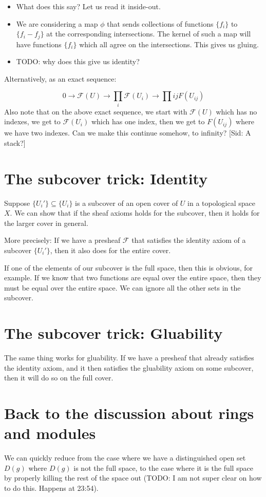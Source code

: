 \documentclass{book}
\newcommand{\F}{\ensuremath{\mathcal{F}}}
\theoremstyle{definition}
\begin{document}
\begin{itemize}
\item What does this say? Let us read it inside-out.
\item We are considering a map  $\phi$ that sends collections of functions $\{ f_i \}$ to $\{ f_i - f_j \}$ at the corresponding
      intersections. The kernel of such a map will have functions $\{ f_i \}$ which all agree on the intersections. This
      gives us gluing.
\item TODO: why does this give us identity?
\end{itemize}

Alternatively, as an exact sequence:

$$ 0 \rightarrow \F(U) \rightarrow \prod_i \F(U_i) \rightarrow \prod{ij} F(U_{ij}) $$
Also note that on the above exact sequence, we start with $\F(U)$ which has no
indexes, we get to $\F(U_i)$ which has one index, then we get to
$F(U_{ij})$ where we have two indexes. Can we make this continue somehow,
to infinity? [Sid: A stack?]

\section{The subcover trick: Identity}
Suppose $\{ U_i' \} \subseteq \{ U_i \}$ is a subcover of an open cover of $U$
in a topological space $X$. We can show that if the sheaf axioms holds for
the subcover, then it holds for the larger cover in general.

More precisely: If we have a presheaf $\F$ that satisfies the identity
axiom of a subcover $\{ U_i' \}$, then it also does for the entire cover.

If one of the elements of our subcover is the full space, then this is obvious,
for example. If we know that two functions are equal over the entire space,
then they must be equal over the entire space. We can ignore all the other
sets in the subcover.

\section{The subcover trick: Gluability}
The same thing works for gluability. If we have a presheaf that already
satisfies the identity axiom, and it then satisfies the gluability axiom
on some subcover, then it will do so on the full cover.

\section{Back to the discussion about rings and modules}
We can quickly reduce from the case where we have a distinguished open set
$D(g)$ where $D(g)$ is not the full space, to the case where it is the
full space by properly killing the rest of the space out (TODO: I am not
super clear on how to do this. Happens at 23:54).
\end{document}
